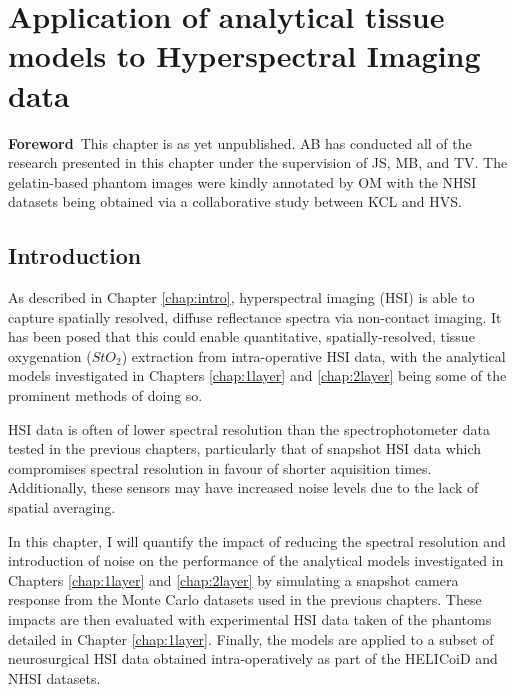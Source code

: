 \chapter[Application of models to HSI data]{Application of analytical tissue models to Hyperspectral Imaging data}\label{chap:HSImodel}
\begin{center}
\begin{minipage}[b]{0.9\linewidth}
\small
\textbf{Foreword\,}
This chapter is as yet unpublished. 
\newline
AB has conducted all of the research presented in this chapter under the supervision of JS, MB, and TV. The gelatin-based phantom images were kindly annotated by OM with the NHSI datasets being obtained via a collaborative study between KCL and HVS. 
\end{minipage}
\end{center}

\section{Introduction}
As described in Chapter \ref{chap:intro}, hyperspectral imaging (HSI) is able to capture spatially resolved, diffuse reflectance spectra via non-contact imaging. It has been posed that this could enable quantitative, spatially-resolved, tissue oxygenation ($StO_2$) extraction from intra-operative HSI data, with the analytical models investigated in Chapters \ref{chap:1layer} and \ref{chap:2layer} being some of the prominent methods of doing so. 

HSI data is often of lower spectral resolution than the spectrophotometer data tested in the previous chapters, particularly that of snapshot HSI data which compromises spectral resolution in favour of shorter aquisition times. Additionally, these sensors may have increased noise levels due to the lack of spatial averaging.

In this chapter, I will quantify the impact of reducing the spectral resolution and introduction of noise on the performance of the analytical models investigated in Chapters \ref{chap:1layer} and \ref{chap:2layer} by simulating a snapshot camera response from the Monte Carlo datasets used in the previous chapters. These impacts are then evaluated with experimental HSI data taken of the phantoms detailed in Chapter \ref{chap:1layer}. Finally, the models are applied to a subset of neurosurgical HSI data obtained intra-operatively as part of the HELICoiD and NHSI datasets. 

